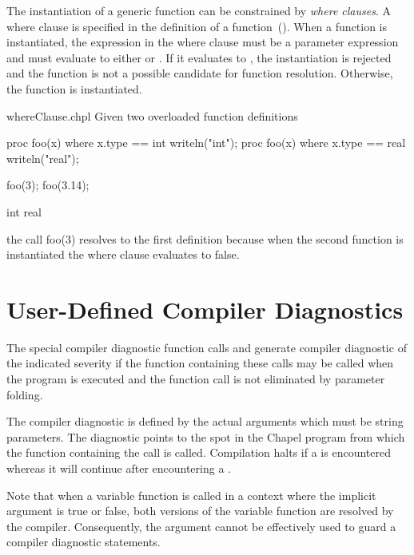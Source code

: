 The instantiation of a generic function can be constrained by {\em
where clauses}.  A where clause is specified in the definition of a
function~().  When a function is
instantiated, the expression in the where clause must be a parameter
expression and must evaluate to either  or .
If it evaluates to , the instantiation is rejected and the
function is not a possible candidate for function resolution.
Otherwise, the function is instantiated.
\begin{chapelexample}{whereClause.chpl}
Given two overloaded function definitions
\begin{chapel}
proc foo(x) where x.type == int { writeln("int"); }
proc foo(x) where x.type == real { writeln("real"); }
\end{chapel}
\begin{chapelpost}
foo(3);
foo(3.14);
\end{chapelpost}
\begin{chapeloutput}
int
real
\end{chapeloutput}
the call foo(3) resolves to the first definition because when the
second function is instantiated the where clause evaluates to false.
\end{chapelexample}

\section{User-Defined Compiler Diagnostics}
\label{User_Defined_Compiler_Errors}

The special compiler diagnostic function calls 
and  generate compiler diagnostic of the
indicated severity if the function containing these calls may be
called when the program is executed and the function call is not
eliminated by parameter folding.

The compiler diagnostic is defined by the actual arguments which must
be string parameters.  The diagnostic points to the spot in the Chapel
program from which the function containing the call is called.
Compilation halts if a  is encountered whereas it
will continue after encountering a .

Note that when a variable function is called in a context where the
implicit  argument is true or false, both versions of the
variable function are resolved by the compiler.  Consequently,
the  argument cannot be effectively used to guard a
compiler diagnostic statements.

